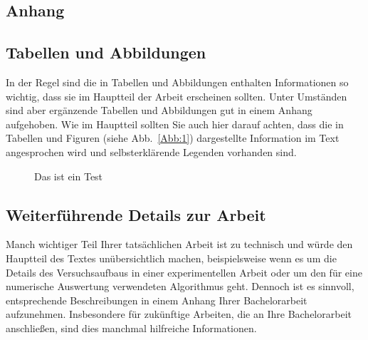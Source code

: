 \documentclass[a4paper,11pt,oneside,final,german,openbib,pdftex]{scrbook}
\begin{document}
\begin{appendix}
\chapter{Anhang}

\section{Tabellen und Abbildungen}

In der Regel sind die in Tabellen und Abbildungen enthalten Informationen 
so wichtig, dass sie im Hauptteil der Arbeit erscheinen sollten. Unter 
Umst\"anden sind aber erg\"anzende Tabellen und Abbildungen gut in einem 
Anhang aufgehoben. Wie im Hauptteil sollten Sie auch hier darauf achten, 
dass die in Tabellen und Figuren (siehe Abb.\ \ref{Abb:1}) dargestellte 
Information im Text angesprochen wird und selbsterkl\"arende Legenden 
vorhanden sind.
\medskip

\begin{figure}[h]
\begin{center}
\label{TestTest}
\caption{Das ist ein Test}
\end{center}

\end{figure}


\section{Weiterf\"uhrende Details zur Arbeit}

Manch wichtiger Teil Ihrer tats\"achlichen Arbeit ist zu technisch 
und w\"urde den Hauptteil des Textes un\"ubersichtlich machen, 
beispielsweise wenn es um die Details des Versuchsaufbaus in einer 
experimentellen Arbeit oder um den f\"ur eine numerische Auswertung 
verwendeten Algorithmus geht. Dennoch ist es sinnvoll, entsprechende 
Beschreibungen in einem Anhang Ihrer Bachelorarbeit aufzunehmen. 
Insbesondere f\"ur zuk\"unftige Arbeiten, die an Ihre Bachelorarbeit 
anschlie{\ss}en, sind dies manchmal hilfreiche Informationen.

\listoffigures
\listoftables


\end{appendix}
\end{document}
